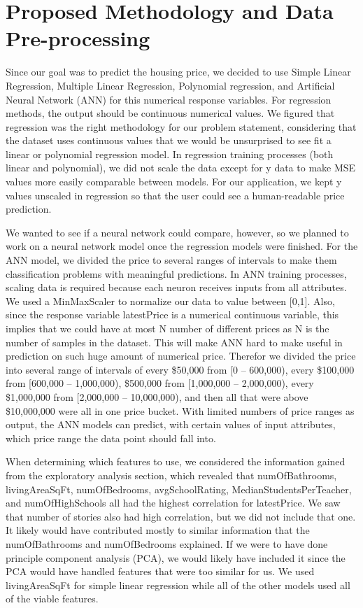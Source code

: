 \documentclass[12pt]{article}
\begin{document}
	\section{Proposed Methodology and Data Pre-processing}
	
	Since our goal was to predict the housing price, we decided to use Simple Linear Regression, Multiple Linear Regression, Polynomial regression, and Artificial Neural Network (ANN) for this numerical response variables. For regression methods, the output should be continuous numerical values. We figured that regression was the right methodology for our problem statement, considering that the dataset uses continuous values that we would be unsurprised to see fit a linear or polynomial regression model. In regression training processes (both linear and polynomial), we did not scale the data except for y data to make MSE values more easily comparable between models. For our application, we kept y values unscaled in regression so that the user could see a human-readable price prediction.
	
	We wanted to see if a neural network could compare, however, so we planned to work on a neural network model once the regression models were finished. For the ANN model, we divided the price to several ranges of intervals to make them classification problems with meaningful predictions. In ANN training processes, scaling data is required because each neuron receives inputs from all attributes. We used a MinMaxScaler to normalize our data to value between [0,1]. Also, since the response variable latestPrice is a numerical continuous variable, this implies that we could have at most N number of different prices as N is the number of samples in the dataset. This will make ANN hard to make useful in prediction on such huge amount of numerical price. Therefor we divided the price into several range of intervals of every \$50,000 from [0 – 600,000), every \$100,000 from [600,000 – 1,000,000), \$500,000 from [1,000,000 – 2,000,000), every \$1,000,000 from [2,000,000 – 10,000,000), and then all that were above \$10,000,000 were all in one price bucket. With limited numbers of price ranges as output, the ANN models can predict, with certain values of input attributes, which price range the data point should fall into.
	
	When determining which features to use, we considered the information gained from the exploratory analysis section, which revealed that numOfBathrooms, livingAreaSqFt, numOfBedrooms, avgSchoolRating, MedianStudentsPerTeacher, and numOfHighSchools all had the highest correlation for latestPrice. We saw that number of stories also had high correlation, but we did not include that one. It likely would have contributed mostly to similar information that the numOfBathrooms and numOfBedrooms explained. If we were to have done principle component analysis (PCA), we would likely have included it since the PCA would have handled features that were too similar for us. We used livingAreaSqFt for simple linear regression while all of the other models used all of the viable features.
	
\end{document}

